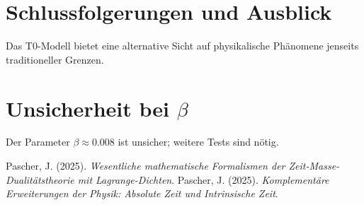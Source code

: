 \documentclass[a4paper,12pt]{article}
\begin{document}
	\section{Schlussfolgerungen und Ausblick}
	Das T0-Modell bietet eine alternative Sicht auf physikalische Phänomene jenseits traditioneller Grenzen.
	
	\section{Unsicherheit bei \(\beta\)}
	Der Parameter \( \beta \approx 0.008 \) ist unsicher; weitere Tests sind nötig.
	
	\begin{thebibliography}{9}
		 Pascher, J. (2025). \textit{Wesentliche mathematische Formalismen der Zeit-Masse-Dualitätstheorie mit Lagrange-Dichten}.
		 Pascher, J. (2025). \textit{Komplementäre Erweiterungen der Physik: Absolute Zeit und Intrinsische Zeit}.
	\end{thebibliography}
	
\end{document}
